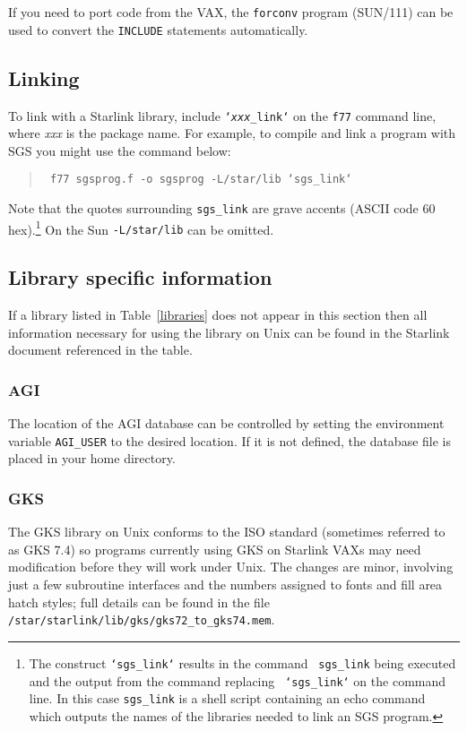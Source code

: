 If you need to port code from the VAX, the {\tt forconv} program (SUN/111)
can be used to convert the {\tt INCLUDE} statements automatically.

\subsection{Linking}

To link with a Starlink library, include {\tt `{\em xxx}\_link`} on
the {\tt f77} command line, where {\em xxx} is the package name. For example,
to compile and link a program with SGS you might use the command below:
\begin{quote}\tt
f77 sgsprog.f -o sgsprog -L/star/lib `sgs\_link`
\end{quote}
Note that the quotes surrounding {\tt sgs\_link} are grave accents (ASCII code 
60 hex).\footnote{The construct {\tt `sgs\_link`} results in the command {\tt
sgs\_link} being executed and the output from the command replacing {\tt
`sgs\_link`} on the command line. In this case {\tt sgs\_link} is a shell script
containing an echo command which outputs the names of the libraries needed to
link an SGS program.} On the Sun {\tt -L/star/lib} can be omitted.

\subsection{Library specific information}

If a library listed in
Table~\ref{libraries} does not appear in this section then all information
necessary for using the library on Unix can be found in the Starlink document
referenced in the table.

\subsubsection{AGI}

The location of the AGI database can be controlled by setting the environment
variable {\tt AGI\_USER} to the desired location. If it is not defined, the
database file is placed in your home directory.

\subsubsection{GKS}
The GKS library on Unix conforms to the ISO standard (sometimes referred to
as  GKS 7.4) so programs currently using GKS on Starlink VAXs may need
modification before they will work under Unix. The changes are minor, involving
just a few subroutine interfaces and the numbers assigned to fonts and fill
area hatch styles; full details can be found in the file {\tt
/star\-/starlink\-/lib\-/gks\-/gks72\_to\_gks74.mem}.

